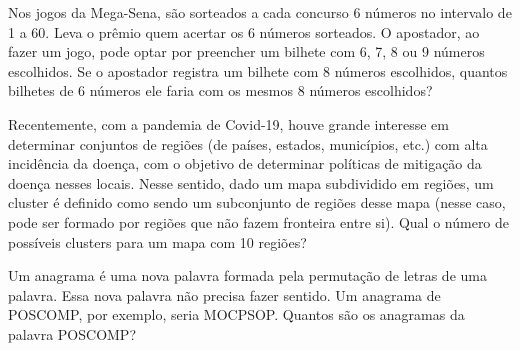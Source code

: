 {
\def\AMCbeginQuestion#1#2{\par\noindent{\bf (POSCOMP 2023 - Questão 04)}}
\begin{question}{} Nos jogos da Mega-Sena, são sorteados a cada concurso 6 números no intervalo de 1 a 60. Leva o prêmio quem acertar os 6 números sorteados. O apostador, ao fazer um jogo, pode optar por preencher um bilhete com 6, 7, 8 ou 9 números escolhidos. Se o apostador registra um bilhete com 8 números escolhidos, quantos bilhetes de 6 números ele faria com os mesmos 8 números escolhidos?
\begin{choices}
\end{choices}
\end{question}
}
%
{
\def\AMCbeginQuestion#1#2{\par\noindent{\bf (POSCOMP 2023 - Questão 05)}}
\begin{question}{} Recentemente, com a pandemia de Covid-19, houve grande interesse em determinar conjuntos de regiões (de países, estados, municípios, etc.) com alta incidência da doença, com o objetivo de determinar políticas de mitigação da doença nesses locais. Nesse sentido, dado um mapa subdividido em regiões, um cluster é definido como sendo um subconjunto de regiões desse mapa (nesse caso, pode ser formado por regiões que não fazem fronteira entre si). Qual o número de possíveis clusters para um mapa com 10 regiões?
\begin{choices}
\end{choices}
\end{question}
}
%
{
\def\AMCbeginQuestion#1#2{\par\noindent{\bf (POSCOMP 2023 - Questão 06)}}
\begin{question}{} Um anagrama é uma nova palavra formada pela permutação de letras de uma palavra. Essa nova palavra não precisa fazer sentido. Um anagrama de POSCOMP, por exemplo, seria MOCPSOP. Quantos são os anagramas da palavra POSCOMP?
\begin{choices}
\end{choices}
\end{question}
}
